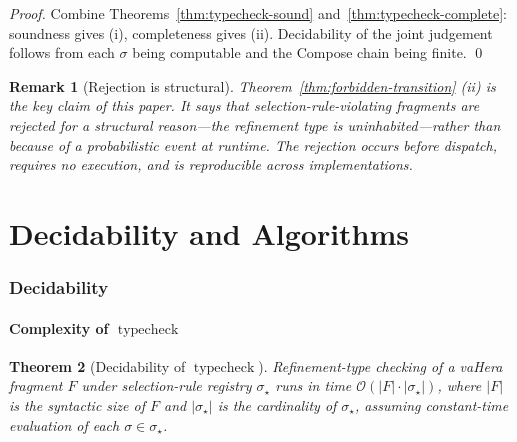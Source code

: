 \documentclass[twocolumn,11pt,a4paper]{article}
\newtheorem{theorem}{Theorem}[section]
\newtheorem{remark}[theorem]{Remark}
\DeclareMathOperator{\typecheck}{typecheck}
\newcommand{\Sel}{\sigma}
\newcommand{\Frag}{F}
\begin{document}
\begin{proof}
Combine Theorems~\ref{thm:typecheck-sound} and~\ref{thm:typecheck-complete}: soundness gives (i), completeness gives (ii). Decidability of the joint judgement follows from each $\Sel$ being computable and the Compose chain being finite. \qed
\end{proof}

\begin{remark}[Rejection is structural]
Theorem~\ref{thm:forbidden-transition} (ii) is the key claim of this paper. It says that selection-rule-violating fragments are rejected for a structural reason---the refinement type is uninhabited---rather than because of a probabilistic event at runtime. The rejection occurs before dispatch, requires no execution, and is reproducible across implementations.
\end{remark}

\part{Decidability and Algorithms}

\section{Decidability}
\label{sec:decidability}

\subsection{Complexity of $\typecheck$}

\begin{theorem}[Decidability of $\typecheck$]
\label{thm:decidability}
Refinement-type checking of a vaHera fragment $\Frag$ under selection-rule registry $\Sel_\star$ runs in time $\mathcal{O}(|\Frag| \cdot |\Sel_\star|)$, where $|\Frag|$ is the syntactic size of $\Frag$ and $|\Sel_\star|$ is the cardinality of $\Sel_\star$, assuming constant-time evaluation of each $\Sel \in \Sel_\star$.
\end{theorem}
\end{document}

